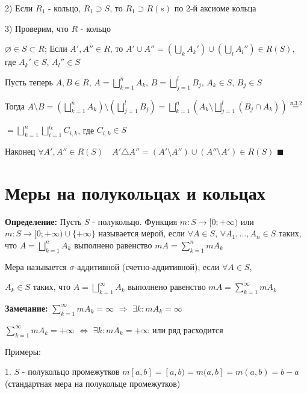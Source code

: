\documentclass[a4paper]{report}
\begin{document}
2) Если $R_1$ - кольцо, $R_1\supset S$, то $R_1\supset R(s)$ по 2-й аксиоме кольца

3) Проверим, что $R$ - кольцо

$\varnothing\in S\subset R$; Если $A',A''\in R$, то $A'\cup A''=\left(\bigcup\limits_k A_k'\right)\cup\left(\bigcup\limits_l
A_l''\right)\in R(S)$, где $A_k'\in S$, $A_l''\in S$

Пусть теперь $A,B\in R$, $A=\bigsqcup\limits_{k=1}^n A_k$, $B=\bigsqcup\limits_{j=1}^l B_j$, $A_k\in S$, $B_j\in S$

Тогда $A\setminus B=\left(\bigsqcup\limits_{k=1}^n A_k\right)\setminus\left(\bigsqcup\limits_{j=1}^l B_j\right)=
\bigsqcup\limits_{k=1}^n\left(A_k\setminus\bigsqcup\limits_{j=1}^l(B_j\cap A_k)\right)\stackrel{\text{л.3.2}}{=}$

\noindent$=\bigsqcup\limits_{k=1}^n\bigsqcup\limits_{i=1}^{i_k}C_{i,k}$, где $C_{i,k}\in S$

Наконец $\forall A',A''\in R(S)\quad A'\triangle A''=(A'\setminus A'')\cup(A''\setminus A')\in R(S)$ $\blacksquare$







\chapter{Меры на полукольцах и кольцах}

\noindent\textbf{Определение:} Пусть $S$ - полукольцо. Функция $m\colon S\to[0;+\infty)$ или $m\colon S\to[0;+\infty)\cup
\{+\infty\}$ называется мерой, если $\forall A\in S$, $\forall A_1,\ldots,A_n\in S$ таких, что $A=\bigsqcup\limits_{k=1}^n
A_k$ выполнено равенство $mA=\sum\limits_{k=1}^n mA_k$

Мера называется $\sigma$-аддитивной (счетно-аддитивной), если $\forall A\in S$, 

\noindent $A_k\in S$ таких, что $A=\bigsqcup\limits_{k=1}^\infty A_k$ выполнено равенство $mA=\sum\limits_{k=1}^\infty mA_k$
\bigskip

\noindent\textbf{Замечание:} $\sum\limits_{k=1}^\infty mA_k=\infty$ $\Rightarrow$ $\exists k\colon mA_k=\infty$

$\sum\limits_{k=1}^\infty mA_k=+\infty$ $\Leftrightarrow$ $\exists k\colon mA_k=+\infty$ или ряд расходится
\bigskip

\noindent Примеры:

1. $S$ - полукольцо промежутков $m[a,b]=[a,b)=m(a,b]=m(a,b)=b-a$ (стандартная мера на полукольце промежутков)
\end{document}
